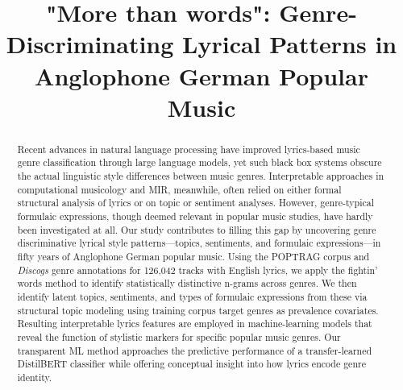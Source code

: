 \documentclass{article}
\title{"More than words": Genre-Discriminating Lyrical Patterns in Anglophone German Popular Music}
\begin{document}
\maketitle

\begin{abstract}
Recent advances in natural language processing have improved lyrics-based music genre classification through large language models, yet such black box systems obscure the actual linguistic style differences between music genres. Interpretable approaches in computational musicology and MIR, meanwhile, often relied on either formal structural analysis of lyrics or on topic or sentiment analyses. However, genre-typical formulaic expressions, though deemed relevant in popular music studies, have hardly been investigated at all. Our study contributes to filling this gap by uncovering genre discriminative lyrical style patterns—topics, sentiments, and formulaic expressions—in fifty years of Anglophone German popular music. Using the POPTRAG corpus and \textit{Discogs} genre annotations for 126,042 tracks with English lyrics, we apply the fightin' words method to identify statistically distinctive n-grams across genres. We then identify latent topics, sentiments, and types of formulaic expressions from these via structural topic modeling using training corpus target genres as prevalence covariates. Resulting interpretable lyrics features are employed in machine-learning models that reveal the function of stylistic markers for specific popular music genres. Our transparent ML method approaches the predictive performance of a transfer-learned DistilBERT classifier while offering conceptual insight into how lyrics encode genre identity. 
\end{abstract}
\end{document}
